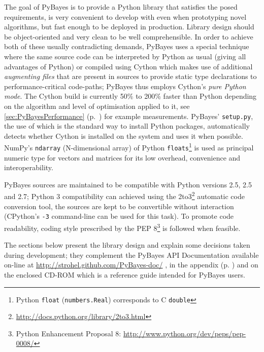 The goal of PyBayes is to provide a Python library that satisfies the posed requirements, is very
convenient to develop with even when prototyping novel algorithms, but fast enough to be deployed in
production. Library design should be object-oriented and very clean to be well comprehensible.
In order to achieve both of these usually contradicting demands, PyBayes uses a special
technique where the same source code can be interpreted by Python as usual (giving all advantages
of Python) or compiled using Cython which makes use of additional \emph{augmenting files} that are present
in sources to provide static
type declarations to performance-critical code-paths; PyBayes thus employs Cython's \emph{pure Python
mode}. The Cython build is currently 50\% to 200\% faster than Python depending on the algorithm and
level of optimisation applied to it, see \autoref{sec:PyBayesPerformance} (p.~\pageref{sec:PyBayesPerformance})
for example measurements. PyBayes' \verb|setup.py|, the use of which is the standard way to install
Python packages, automatically detects whether Cython is installed on the system and uses it when
possible. NumPy's \verb|ndarray| (N-dimensional array) of Python \verb|floats|\footnote{Python
\verb|float| (\verb|numbers.Real|) corresponds to C \verb|double|} is used as principal
numeric type for vectors and matrices for its low overhead, convenience and interoperability.

PyBayes sources are maintained to be compatible with Python versions 2.5, 2.5 and 2.7; Python 3
compatibility can achieved using the 2to3\footnote{\url{http://docs.python.org/library/2to3.html}}
automatic code conversion tool, the sources are kept to be convertible without interaction
(CPython's \verb|-3| command-line can be used for this task). To promote code readability, coding
style prescribed by the PEP 8\footnote{Python Enhancement Proposal 8:
\url{http://www.python.org/dev/peps/pep-0008/}} is followed when feasible.

The sections below present the library design and explain some decisions taken during development;
they complement the PyBayes API Documentation available on-line at \url{http://strohel.github.com/PyBayes-doc/}%
\ifattachements%
, in the appendix (p. \pageref{chap:APIDocs}) and on the enclosed CD-ROM
\fi
which is a reference guide intended for PyBayes users.

